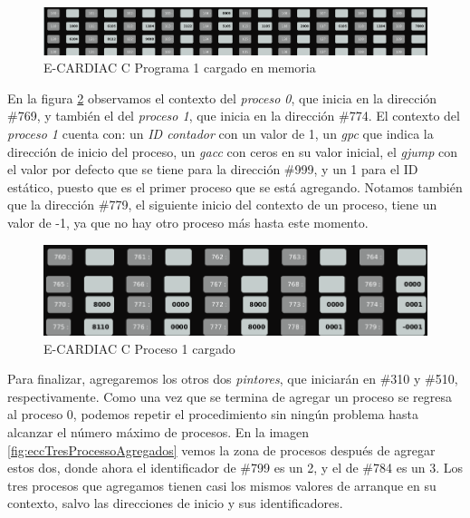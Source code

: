 \documentclass[letterpaper,12pt,oneside]{book}
\begin{document}
        \begin{figure}[h]		
			\centering
			\includegraphics[scale=0.25]{media/CARDIACC/eccPrograma1Cargado.png}
			\caption{E-CARDIAC C Programa 1 cargado en memoria}
			\label{fig:eccPrograma1Cargado}
		\end{figure}	
  
        En la figura \ref{fig:eccZPProceso1}
		observamos el contexto del \textit{proceso 0}, que inicia en la dirección \#769, y también el del \textit{proceso 1}, que inicia en la dirección 
		\#774.
		El contexto del \textit{proceso 1} cuenta con: un \textit{ID contador}
		con un valor de 1, un \textit{gpc} que indica la dirección de inicio del proceso, un \textit{gacc} con ceros en su valor inicial,
		el \textit{gjump} con el valor por defecto que se tiene para la dirección \#999, y  un 1 para el ID estático, puesto que es el primer 
		proceso que se está agregando. Notamos también que la dirección \#779, el siguiente inicio del contexto de un proceso, tiene un valor de -1, 
		ya que no hay otro proceso más hasta este 
		momento.
		
		\begin{figure}[h]		
			\centering
			\includegraphics[scale=0.45]{media/CARDIACC/eccZonaProcesosPrograma1.png}
			\caption{E-CARDIAC C Proceso 1 cargado}
			\label{fig:eccZPProceso1}
		\end{figure}	
		

		Para finalizar, agregaremos los otros dos \textit{pintores}, que iniciarán en 
		\#310 y \#510, 
		respectivamente. Como una vez que se termina de agregar un proceso se regresa al proceso 0, podemos repetir el procedimiento sin ningún problema
		hasta alcanzar el número máximo de procesos. En la imagen \ref{fig:eccTresProcessoAgregados} vemos la zona
		de procesos después de agregar estos dos, donde ahora el identificador de \#799 es un 2, y el de \#784 es
		un 3. Los tres procesos que agregamos tienen casi los mismos valores de arranque en su contexto, salvo las direcciones de inicio
		y sus identificadores.
		
\end{document}

